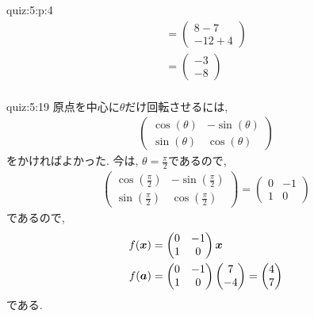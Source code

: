 \begin{answerof}{quiz:5:p:4}
\begin{align*}
  =\begin{pmatrix}8-7\\-12+4\end{pmatrix}\\
  =\begin{pmatrix}-3\\-8\end{pmatrix}\\
\end{align*}
\end{answerof}

\begin{answerof}{quiz:5:19}
  原点を中心に$\theta$だけ回転させるには,
  \begin{align*}
    \begin{pmatrix}
      \cos(\theta)&-\sin(\theta)\\
      \sin(\theta)&\cos(\theta)
    \end{pmatrix}
  \end{align*}
  をかければよかった.
  今は, $\theta=\frac{\pi}{2}$であるので,
  \begin{align*}
    \begin{pmatrix}
      \cos(\frac{\pi}{2})&-\sin(\frac{\pi}{2})\\
      \sin(\frac{\pi}{2})&\cos(\frac{\pi}{2})
    \end{pmatrix}
    =
    \begin{pmatrix}
      0&-1\\
      1&0
    \end{pmatrix}
  \end{align*}
  であるので,
  \begin{align*}
    f(\boldsymbol{x})&=
    \begin{pmatrix}
      0&-1\\
      1&0
    \end{pmatrix}
    \boldsymbol{x}\\
    f(\boldsymbol{a})&=
    \begin{pmatrix}
      0&-1\\
      1&0
    \end{pmatrix}
    \begin{pmatrix}
      7\\
      -4
    \end{pmatrix}
    =
    \begin{pmatrix}
      4\\7
    \end{pmatrix}
  \end{align*}
  である.



\end{answerof}
